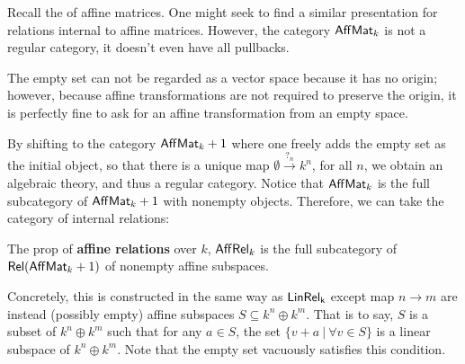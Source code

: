 Recall the of affine matrices. One might seek to find a similar presentation for relations internal to affine matrices.
However, the category $\mathsf{Aff}\mathsf{Mat}_k$ is not a regular category, it doesn't even have all pullbacks.

The empty set can not be regarded as a vector space because it has no origin; however, because affine transformations are not required to preserve the origin, it is perfectly fine to ask for an affine transformation from an empty space.


By shifting to the category $\mathsf{Aff}\mathsf{Mat}_k+1$ where one freely adds the empty set as the initial object, so that there is a unique map $\emptyset \xrightarrow{?_n} k^n$, for all $n$,  we obtain an algebraic theory, and thus a regular category.  Notice that $\mathsf{Aff}\mathsf{Mat}_k$ is the full subcategory of $\mathsf{Aff}\mathsf{Mat}_k+1$ with nonempty objects.  Therefore, we can take the category of internal relations:
\begin{definition}
The prop of {\bf affine relations} over $k$, $\mathsf{Aff}\mathsf{Rel}_{k}$ is the full subcategory of  $\mathsf{Rel}(\mathsf{Aff}\mathsf{Mat}_k+1)$ of nonempty affine subspaces.
\end{definition}
Concretely, this is constructed in the same way as $\sf LinRel_k$ except map $n\to m$ are instead (possibly empty) affine subspaces $S \subseteq k^n\oplus k^m$. That is to say, $S$ is a subset of $k^n\oplus k^m$ such that for any $a \in S$, the set $\{v+a\ |\ \forall v \in S\}$ is a linear subspace of  $k^n\oplus k^m$.  Note that the empty set vacuously satisfies this condition.


